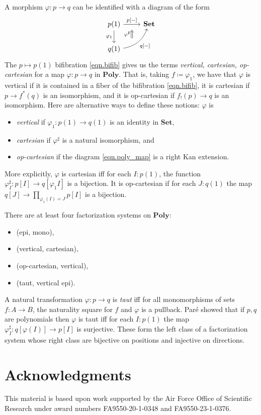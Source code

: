 \documentclass[11pt, one side, article]{memoir}
\theoremstyle{definition}
\theoremstyle{plain}
\newcommand{\Cat}[1]{\mathbf{#1}}%
\newcommand{\smset}{\Cat{Set}}
\newcommand{\poly}{\Cat{Poly}}
\newcommand{\0}{\textsf{0}}
\newcommand{\1}{\tn{\textsf{1}}}
\newcommand{\thanksAFOSR}[1]{This material is based upon work supported by the Air Force Office of Scientific Research under award numbers #1}
\begin{document}
A morphism $\varphi\colon p\to q$ can be identified with a diagram of the form
\begin{equation}\label{eqn.poly_map}
\begin{tikzcd}
	p(1)\ar[d, "\varphi_1"']\ar[r, "{p[-]}", ""' name=p]&
	\smset\\
	q(1)\ar[ur, bend right, "{q[-]}"', "" name=q]
	\ar[to=p, from=q-|p, Rightarrow, shorten=3pt, "\varphi^\sharp"]
\end{tikzcd}
\end{equation}
The $p\mapsto p(1)$ bifibration \eqref{eqn.bifib} gives us the terms \emph{vertical, cartesian,  op-cartesian} for a map $\varphi\colon p\to q$ in $\poly$. That is, taking $f\coloneqq\varphi_1$, we have that $\varphi$ is vertical if it is contained in a fiber of the bifibration \eqref{eqn.bifib}, it is cartesian if $p\to f^*(q)$ is an isomorphism, and it is op-cartesian if $f_!(p)\to q$ is an isomorphism. Here are alternative ways to define these notions: $\varphi$ is 
\begin{itemize}
	\item \emph{vertical} if $\varphi_1\colon p(1)\to q(1)$ is an identity in $\smset$,
	\item \emph{cartesian} if $\varphi^\sharp$ is a natural isomorphism, and
	\item \emph{op-cartesian} if the diagram \eqref{eqn.poly_map} is a right Kan extension.
\end{itemize}
More explicitly, $\varphi$ is cartesian iff for each $I: p(1)$, the function $\varphi^\sharp_I\colon p[I]\to q[\varphi_1I]$ is a bijection. It is op-cartesian if for each $J: q(1)$ the map $q[J]\to\prod\limits_{\varphi_1(I)=J}p[I]$ is a bijection.

There are at least four factorization systems on $\poly$:
\begin{itemize}
	\item (epi, mono),
	\item (vertical, cartesian),
	\item (op-cartesian, vertical),
	\item (taut, vertical epi).
\end{itemize}
A natural transformation $\varphi\colon p\to q$ is \emph{taut} iff for all monomorphisms of sets $f\colon A\to B$, the naturality square for $f$ and $\varphi$ is a pullback. Par\'{e} showed that if $p,q$ are polynomials then $\varphi$ is taut iff for each $I:p(1)$ the map $\varphi_I^\sharp\colon q[\varphi(I)]\to p[I]$ is surjective. These form the left class of a factorization system whose right class are bijective on positions and injective on directions.


\section*{Acknowledgments}
\thanksAFOSR{FA9550-20-1-0348 and FA9550-23-1-0376}.

\printbibliography 
\end{document}
